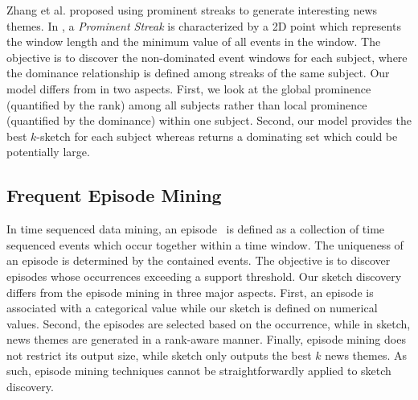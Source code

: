 Zhang et al.\cite{zhang2014discovering} proposed using prominent streaks to generate interesting news themes.
In \cite{zhang2014discovering}, a \emph{Prominent Streak} is characterized by a 2D point which represents the window length and the minimum value of all events in the window. The objective is to discover the non-dominated event windows for each subject, where the dominance relationship is defined among streaks of the same subject. Our model differs from \cite{zhang2014discovering} in two aspects. First, we look at the global prominence (quantified by the rank) among all subjects rather than local prominence (quantified by the dominance) within one subject. Second, our model provides the best $k$-sketch for each subject whereas \cite{zhang2014discovering} returns a dominating set which could be potentially large. 
 
\subsection{Frequent Episode Mining}
In time sequenced data mining, an episode~\cite{mannila1997discepisodes,
zhou2010serialepisodes, tatti2012strictepisodes, laxman2007nonoverlapepisodes} is 
defined as a collection of time sequenced events which occur together within a time window. The uniqueness of an episode is determined by the contained events. The objective is to discover episodes whose 
occurrences exceeding a support threshold. 
Our sketch discovery differs from the episode mining in three major aspects. First, an episode is associated with a categorical value while our sketch is defined on numerical values. Second, the episodes are selected based on the occurrence, while in sketch, news themes are generated in a rank-aware manner. Finally, episode mining does not restrict its output size, while sketch only outputs the best $k$ news themes. As such, episode mining techniques cannot be straightforwardly applied to sketch discovery.



